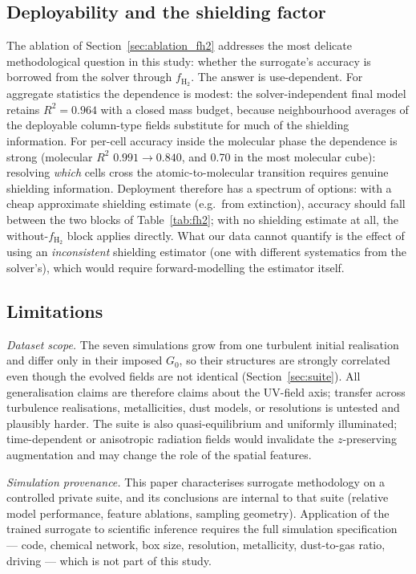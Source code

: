 \documentclass[fleqn,usenatbib]{rasti}
\newcommand{\Gzero}{G_0}
\newcommand{\fshield}{f_{\mathrm{H_2}}}
\newcommand{\Rsq}{R^2}
\begin{document}
\subsection{Deployability and the shielding factor}
\label{sec:deploy}

The ablation of Section~\ref{sec:ablation_fh2} addresses the most
delicate methodological question in this study: whether the surrogate's
accuracy is borrowed from the solver through \(\fshield\). The answer is
use-dependent. For aggregate statistics the dependence is modest: the
solver-independent final model retains \(\Rsq = 0.964\) with a closed
mass budget, because neighbourhood averages of the deployable
column-type fields substitute for much of the shielding information.
For per-cell accuracy inside the molecular phase the dependence is
strong (molecular \(\Rsq\) \(0.991 \rightarrow 0.840\), and 0.70 in the
most molecular cube): resolving \emph{which} cells cross the
atomic-to-molecular transition requires genuine shielding information.
Deployment therefore has a spectrum of options: with a cheap
approximate shielding estimate (e.g.\ from extinction), accuracy should
fall between the two blocks of Table~\ref{tab:fh2}; with no shielding
estimate at all, the without-\(\fshield\) block applies directly. What
our data cannot quantify is the effect of using an \emph{inconsistent}
shielding estimator (one with different systematics from the solver's),
which would require forward-modelling the estimator itself.

\subsection{Limitations}
\label{sec:limitations}

\textit{Dataset scope.} The seven simulations grow from one turbulent
initial realisation and differ only in their imposed \(\Gzero\), so their
structures are strongly correlated even though the evolved fields are
not identical (Section~\ref{sec:suite}). All generalisation claims are
therefore claims about the UV-field axis; transfer across turbulence
realisations, metallicities, dust models, or resolutions is untested and
plausibly harder. The suite is also quasi-equilibrium and uniformly
illuminated; time-dependent or anisotropic radiation fields would
invalidate the \(z\)-preserving augmentation and may change the role of
the spatial features.

\textit{Simulation provenance.} This paper characterises surrogate
methodology on a controlled private suite, and its conclusions are
internal to that suite (relative model performance, feature ablations,
sampling geometry). Application of the trained surrogate to scientific
inference requires the full simulation specification --- code, chemical
network, box size, resolution, metallicity, dust-to-gas ratio, driving
--- which is not part of this study.
\end{document}

